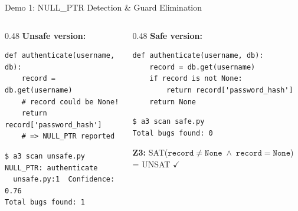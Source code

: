 \documentclass[aspectratio=169]{beamer}
\begin{document}
\begin{frame}[fragile]{Demo 1: NULL\_PTR Detection \& Guard Elimination}

\begin{columns}[T]
\begin{column}{0.48\textwidth}
\textbf{Unsafe version:}
\begin{lstlisting}
def authenticate(username, db):
    record = db.get(username)
    # record could be None!
    return record['password_hash']
    # => NULL_PTR reported
\end{lstlisting}
\vspace{0.5em}
\begin{lstlisting}[style=bash]
$ a3 scan unsafe.py
NULL_PTR: authenticate
  unsafe.py:1  Confidence: 0.76
Total bugs found: 1
\end{lstlisting}
\end{column}
\begin{column}{0.48\textwidth}
\textbf{Safe version:}
\begin{lstlisting}
def authenticate(username, db):
    record = db.get(username)
    if record is not None:
        return record['password_hash']
    return None
\end{lstlisting}
\vspace{0.5em}
\begin{lstlisting}[style=bash]
$ a3 scan safe.py
Total bugs found: 0
\end{lstlisting}
\vspace{0.3em}
\textcolor{msgreen}{\textbf{Z3:}} SAT($\texttt{record} \neq \texttt{None} \;\land\; \texttt{record} = \texttt{None}$) = UNSAT $\checkmark$
\end{column}
\end{columns}

\end{frame}
\end{document}

